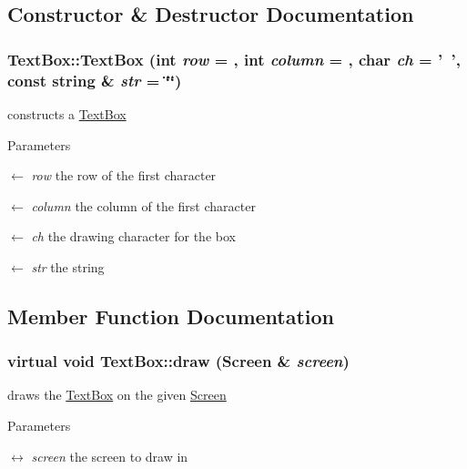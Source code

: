 \subsection{Constructor \& Destructor Documentation}
\hypertarget{classTextBox_ac0d2d825a2ca3f37f8d417c437032d71}{
\subsubsection[{TextBox}]{\setlength{\rightskip}{0pt plus 5cm}TextBox::TextBox (int {\em row} = {}, \/  int {\em column} = {}, \/  char {\em ch} = {\ttfamily '~'}, \/  const string \& {\em str} = {\ttfamily \char`\"{}\char`\"{}})}}
\label{classTextBox_ac0d2d825a2ca3f37f8d417c437032d71}
constructs a \hyperlink{classTextBox}{TextBox}


\begin{DoxyParams}{Parameters}
\item[\mbox{$\leftarrow$} {\em row}]the row of the first character \item[\mbox{$\leftarrow$} {\em column}]the column of the first character \item[\mbox{$\leftarrow$} {\em ch}]the drawing character for the box \item[\mbox{$\leftarrow$} {\em str}]the string \end{DoxyParams}


\subsection{Member Function Documentation}
\hypertarget{classTextBox_ae28a00e6cd50d5432c02b579b0fb32ed}{
\subsubsection[{draw}]{\setlength{\rightskip}{0pt plus 5cm}virtual void TextBox::draw ({\bf Screen} \& {\em screen})}}
\label{classTextBox_ae28a00e6cd50d5432c02b579b0fb32ed}


draws the \hyperlink{classTextBox}{TextBox} on the given \hyperlink{classScreen}{Screen} 
\begin{DoxyParams}{Parameters}
\item[\mbox{$\leftrightarrow$} {\em screen}]the screen to draw in \end{DoxyParams}


